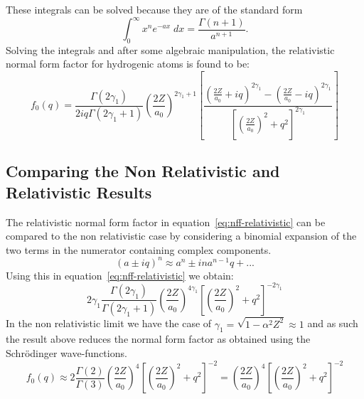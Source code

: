 \documentclass[a4paper,titlepage]{report}
\begin{document}
	These integrals can be solved because they are of the standard form
	\[
		\int_0^\infty x^n e^{-ax} \; dx = \frac{\Gamma(n+1)}{a^{n+1}}.
	\]
	Solving the integrals and after some algebraic manipulation, the
	relativistic normal form factor for hydrogenic atoms is found to be:
	\begin{equation} \label{eq:nff-relativistic}
		\boxed{
			f_0(q) = 
			\frac{\Gamma(2\gamma_1)}{2iq \Gamma(2\gamma_1+1)}
			\left(
				\frac{2Z}{a_0}
			\right)^{2\gamma_1 + 1}
			\left[
				\frac{
					\left(
						\frac{2Z}{a_0} + iq
					\right)^{2\gamma_1}
					-
					\left(
						\frac{2Z}{a_0} - iq
					\right)^{2\gamma_1}
				} {
					\left[
						\left(
							\frac{2Z}{a_0} 
						\right)^2	
						+ q^2
					\right]^{2\gamma_1}
				}
			\right]
		}
	\end{equation}

	\subsection{Comparing the Non Relativistic and Relativistic Results}
	The relativistic normal form factor in equation~\ref{eq:nff-relativistic}
	can be compared to the non relativistic case by considering a binomial
	expansion of the two terms in the numerator containing complex components.
	\begin{equation*} 
		(a \pm iq)^n \approx a^n \pm ina^{n-1}q + ...
	\end{equation*}
	Using this in equation~\ref{eq:nff-relativistic} we obtain:
	\begin{equation*}
		2 \gamma_1 \frac{\Gamma(2\gamma_1)}{\Gamma(2\gamma_1 + 1)} 
		\left(
			\frac{2Z}{a_0}
		\right)^{4\gamma_1}
			\left[
				\left(
					\frac{2Z}{a_0}
				\right)^2 + q^2
			\right]^{-2\gamma_1}
	\end{equation*}
	In the non relativistic limit we have the case of 
	$\gamma_1 = \sqrt{1 - \alpha^2 Z^2} \approx 1$ and as such the result above
	reduces the normal form factor as obtained using the Schr\"odinger
	wave-functions.
	\begin{equation*}
		f_0(q) \approx
		2 \frac{\Gamma(2)}{\Gamma(3)}
		\left(
			\frac{2 Z}{a_0}
		\right)^4
			\left[
				\left(
					\frac{2 Z}{a_0}
				\right)^2 + q^2
			\right]^{-2}
		=
		\left(
			\frac{2Z}{a_0}
		\right)^4
			\left[
				\left(
					\frac{2Z}{a_0}
				\right)^2 + q^2
			\right]^{-2}
	\end{equation*}

\end{document}
